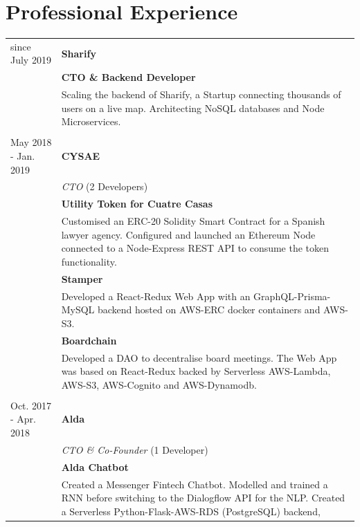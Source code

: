 \documentclass[11pt]{article}
\begin{document}
\section*{Professional Experience}
\begin{tabularx}{\textwidth}{lX}
  since July 2019        & \textbf{Sharify} \\
                         & \textbf{CTO \& Backend Developer} \\[2mm]
                         & Scaling the backend of Sharify, a Startup connecting thousands of
                         users on a live map. Architecting NoSQL databases and Node Microservices.\\\\
  May 2018 - Jan. 2019   & \textbf{CYSAE} \\
                         & \textit{CTO} (2 Developers) \\[2mm]
                         & \textbf{Utility Token for Cuatre Casas} \\
                         & Customised an ERC-20 Solidity Smart Contract for
                           a Spanish lawyer agency. Configured and launched an
                           Ethereum Node connected to a Node-Express REST API to consume
                           the token functionality. \\[1.5mm]
                         & \textbf{Stamper} \\
                         & Developed a React-Redux Web App with an
                           GraphQL-Prisma-MySQL backend hosted on AWS-ERC docker
                           containers and AWS-S3. \\[1.5mm]
                         & \textbf{Boardchain} \\
                         & Developed a DAO to decentralise board meetings. The
                           Web App was based on React-Redux backed by
                           Serverless AWS-Lambda, AWS-S3, AWS-Cognito and AWS-Dynamodb. \\\\
  Oct. 2017 - Apr. 2018  & \textbf{Alda} \\
                         & \textit{CTO \& Co-Founder} (1 Developer) \\[2mm]
                         & \textbf{Alda Chatbot} \\
                         & Created a Messenger Fintech Chatbot. Modelled and
                           trained a RNN before switching to the Dialogflow API
                           for the NLP. Created a Serverless Python-Flask-AWS-RDS (PostgreSQL) backend,

\end{tabularx}
\end{document}
